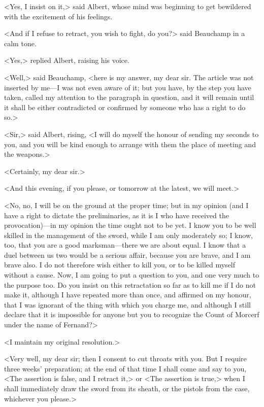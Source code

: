  <Yes, I insist on it,> said Albert, whose mind was beginning to get bewildered with the excitement of his feelings. 

 <And if I refuse to retract, you wish to fight, do you?> said Beauchamp in a calm tone. 

 <Yes,> replied Albert, raising his voice. 

 <Well,> said Beauchamp, <here is my answer, my dear sir. The article was not inserted by me—I was not even aware of it; but you have, by the step you have taken, called my attention to the paragraph in question, and it will remain until it shall be either contradicted or confirmed by someone who has a right to do so.> 

 <Sir,> said Albert, rising, <I will do myself the honour of sending my seconds to you, and you will be kind enough to arrange with them the place of meeting and the weapons.> 

 <Certainly, my dear sir.> 

 <And this evening, if you please, or tomorrow at the latest, we will meet.> 

 <No, no, I will be on the ground at the proper time; but in my opinion (and I have a right to dictate the preliminaries, as it is I who have received the provocation)—in my opinion the time ought not to be yet. I know you to be well skilled in the management of the sword, while I am only moderately so; I know, too, that you are a good marksman—there we are about equal. I know that a duel between us two would be a serious affair, because you are brave, and I am brave also. I do not therefore wish either to kill you, or to be killed myself without a cause. Now, I am going to put a question to you, and one very much to the purpose too. Do you insist on this retractation so far as to kill me if I do not make it, although I have repeated more than once, and affirmed on my honour, that I was ignorant of the thing with which you charge me, and although I still declare that it is impossible for anyone but you to recognize the Count of Morcerf under the name of Fernand?> 

 <I maintain my original resolution.> 

 <Very well, my dear sir; then I consent to cut throats with you. But I require three weeks' preparation; at the end of that time I shall come and say to you, <The assertion is false, and I retract it,> or <The assertion is true,> when I shall immediately draw the sword from its sheath, or the pistols from the case, whichever you please.> 


